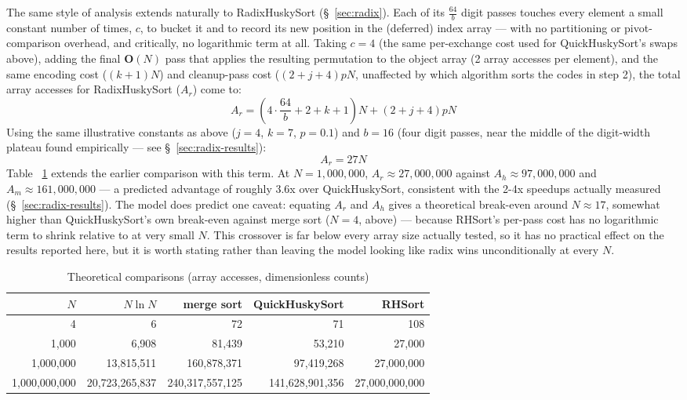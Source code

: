 \documentclass[twoside,leqno,twocolumn]{article}
\begin{document}
The same style of analysis extends naturally to RadixHuskySort (\S~\ref{sec:radix}).
Each of its $\frac{64}{b}$ digit passes touches every element a small constant number of times,
$c$, to bucket it and to record its new position in the (deferred) index array —
with no partitioning or pivot-comparison overhead, and critically, no logarithmic term at all.
Taking $c = 4$ (the same per-exchange cost used for QuickHuskySort's swaps above),
adding the final $\textbf{O}(N)$ pass that applies the resulting permutation to the object array (2 array accesses per element),
and the same encoding cost ($(k+1)N$) and cleanup-pass cost ($(2 + j + 4)pN$,
unaffected by which algorithm sorts the codes in step 2), the total array accesses for RadixHuskySort ($A_r$) come to:
\[A_r = \left(4 \cdot \frac{64}{b} + 2 + k + 1\right) N + (2 + j + 4)pN\]
Using the same illustrative constants as above ($j = 4$, $k = 7$, $p = 0.1$)
and $b = 16$ (four digit passes, near the middle of the digit-width plateau found empirically —
see \S~\ref{sec:radix-results}):
\[A_r = 27 N\]
Table ~\ref{tab:Comparison} extends the earlier comparison with this term.
At $N = 1{,}000{,}000$, $A_r \approx 27{,}000{,}000$ against $A_h \approx 97{,}000{,}000$ and $A_m \approx 161{,}000{,}000$ —
a predicted advantage of roughly 3.6x over QuickHuskySort,
consistent with the 2-4x speedups actually measured (\S~\ref{sec:radix-results}).
The model does predict one caveat:
equating $A_r$ and $A_h$ gives a theoretical break-even around $N \approx 17$,
somewhat higher than QuickHuskySort's own break-even against merge sort ($N = 4$,
above) — because RHSort's per-pass cost has no logarithmic term to shrink relative to at very small $N$.
This crossover is far below every array size actually tested, so it has no practical effect on the results reported here,
but it is worth stating rather than leaving the model looking like radix wins unconditionally at every $N$.
 \begin{table}
  \caption{Theoretical comparisons (array accesses, dimensionless counts)}
  \label{tab:Comparison}
  \centering
  \begin{tabular}{rrrrr}
    \toprule
    $N$ & $N \ln N$ & merge sort & QuickHuskySort & RHSort \\
    \midrule
     4 & 6 & 72 & 71 & 108 \\
     1,000 & 6,908 & 81,439 & 53,210 & 27,000 \\
     1,000,000 & 13,815,511 & 160,878,371 & 97,419,268 & 27,000,000 \\
     1,000,000,000 & 20,723,265,837 & 240,317,557,125 & 141,628,901,356 & 27,000,000,000 \\

    \bottomrule
  \end{tabular}
\end{table}
\end{document}
